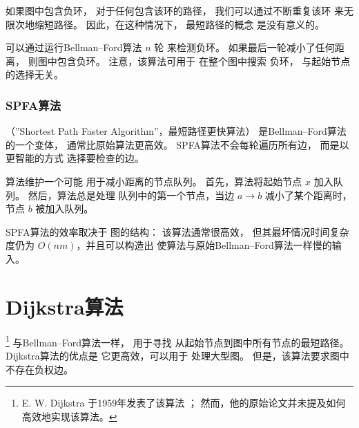 如果图中包含负环，
对于任何包含该环的路径，
我们可以通过不断重复该环
来无限次地缩短路径。
因此，在这种情况下，
最短路径的概念
是没有意义的。

可以通过运行Bellman–Ford算法 $n$ 轮
来检测负环。
如果最后一轮减小了任何距离，
则图中包含负环。
注意，该算法可用于
在整个图中搜索
负环，
与起始节点的选择无关。

\subsubsection{SPFA算法}


（''Shortest Path Faster Algorithm''，最短路径更快算法）\cite{fan94}
是Bellman–Ford算法的一个变体，
通常比原始算法更高效。
SPFA算法不会每轮遍历所有边，
而是以更智能的方式
选择要检查的边。

算法维护一个可能
用于减小距离的节点队列。
首先，算法将起始节点 $x$
加入队列。
然后，算法总是处理
队列中的第一个节点，当边
$a \rightarrow b$ 减小了某个距离时，
节点 $b$ 被加入队列。
% 
% 

SPFA算法的效率取决于
图的结构：
该算法通常很高效，
但其最坏情况时间复杂度仍为
$O(nm)$，并且可以构造出
使算法与原始Bellman–Ford算法一样慢的输入。

\section{Dijkstra算法}


\footnote{E. W. Dijkstra 于1959年发表了该算法 \cite{dij59}；
然而，他的原始论文并未提及如何高效地实现该算法。}
与Bellman–Ford算法一样，
用于寻找
从起始节点到图中所有节点的最短路径。
Dijkstra算法的优点是
它更高效，可以用于
处理大型图。
但是，该算法要求图中
不存在负权边。

